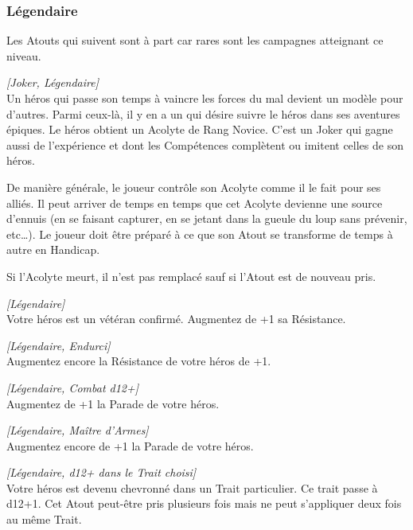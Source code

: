 \newpage
\subsubsection{Légendaire}

Les Atouts qui suivent sont à part car rares sont les campagnes atteignant ce niveau.

\begin{description}[align=left]
    \item [Acolyte]
        \emph{[Joker, Légendaire]}\\
        Un héros qui passe son temps à vaincre les forces du mal devient un modèle pour d’autres. Parmi ceux-là, il y en a un qui désire suivre le héros dans ses aventures épiques. Le héros obtient un Acolyte de Rang Novice. C’est un Joker qui gagne aussi de l’expérience et dont les Compétences complètent ou imitent celles de son héros.

        De manière générale, le joueur contrôle son Acolyte comme il le fait pour ses alliés. Il peut arriver de temps en temps que cet Acolyte devienne une source d’ennuis (en se faisant capturer, en se jetant dans la gueule du loup sans prévenir, etc\ldots). Le joueur doit être préparé à ce que son Atout se transforme de temps à autre en Handicap.

        Si l’Acolyte meurt, il n’est pas remplacé sauf si l’Atout est de nouveau pris.

    \item [Endurci]
        \emph{[Légendaire]}\\
        Votre héros est un vétéran confirmé. Augmentez de +1 sa Résistance.

    \item [Coriace]
        \emph{[Légendaire, Endurci]}\\
        Augmentez encore la Résistance de votre héros de +1.

    \item [Maître d’Armes]
        \emph{[Légendaire, Combat d12+]}\\
        Augmentez de +1 la Parade de votre héros.

    \item [Maître d’Armes Légendaire]
        \emph{[Légendaire, Maître d’Armes]}\\
        Augmentez encore de +1 la Parade de votre héros.

    \item [Professionnel]
        \label{sec:atout-professionnel}
        \emph{[Légendaire, d12+ dans le Trait choisi]}\\
        Votre héros est devenu chevronné dans un Trait particulier. Ce trait passe à d12+1. Cet Atout peut-être pris plusieurs fois mais ne peut s’appliquer deux fois au même Trait.


\end{description}
